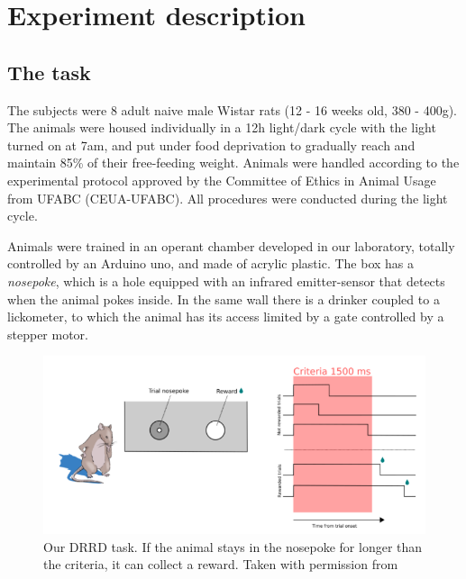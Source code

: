 \chapter{Experiment description}
\label{chap:experiment}

\section{The task}
    The subjects were 8 adult naive male Wistar rats (12 - 16 weeks old, 380 - 400g). The animals were housed individually in a 12h light/dark cycle with the light turned on at 7am, and put under food deprivation to gradually reach and maintain 85\% of their free-feeding weight. Animals were handled according to the experimental protocol approved by the Committee of Ethics in Animal Usage from UFABC (CEUA-UFABC). All procedures were conducted during the light cycle.
    
    Animals were trained in an operant chamber developed in our laboratory, totally controlled by an Arduino uno, and made of acrylic plastic. The box has a \textit{nosepoke}, which is a hole equipped with an infrared emitter-sensor that detects when the animal pokes inside. In the same wall there is a drinker coupled to a lickometer, to which the animal has its access limited by a gate controlled by a stepper motor.
    
    \begin{figure}
        \centering
        \includegraphics[width=\textwidth]{figures/tarefa_eli.png}
        \caption[Our DRRD task]{Our DRRD task. If the animal stays in the nosepoke for longer than the criteria, it can collect a reward. Taken with permission from \cite{Eliezyer2018}}
        \label{fig:task}
    \end{figure}

